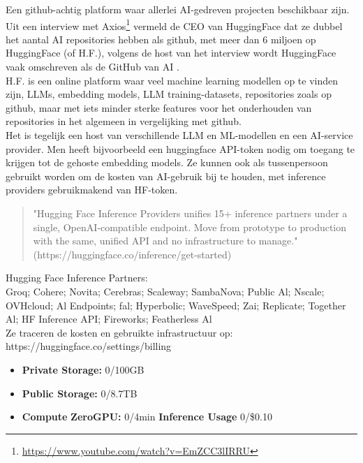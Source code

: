 Een github-achtig platform waar allerlei AI-gedreven projecten beschikbaar zijn. \\

Uit een interview met Axios\footnote{\href{https://www.youtube.com/watch?v=EmZCC3lIRRU}{https://www.youtube.com/watch?v=EmZCC3lIRRU}} vermeld de CEO van HuggingFace dat ze dubbel het aantal AI repositories hebben als github, met meer dan 6 miljoen op HuggingFace (of H.F.), volgens de host van het interview wordt HuggingFace vaak omschreven als de GitHub van AI \autocite{Rubin2025}. \\

H.F. is een online platform waar veel machine learning modellen op te vinden zijn, LLMs, embedding models, LLM training-datasets, repositories zoals op github, maar met iets minder sterke features voor het onderhouden van repositories in het algemeen in vergelijking met github. \\

Het is tegelijk een host van verschillende LLM en ML-modellen en een AI-service provider. Men heeft bijvoorbeeld een huggingface API-token nodig om toegang te krijgen tot de gehoste embedding models. Ze kunnen ook als tussenpersoon gebruikt worden om de kosten van AI-gebruik bij te houden, met inference providers gebruikmakend van HF-token.

\begin{quote}
    "Hugging Face Inference Providers unifies 15+ inference partners under a single, OpenAI‑compatible endpoint.
    Move from prototype to production with the same, unified API and no infrastructure to manage." \\
    (https://huggingface.co/inference/get-started)
\end{quote}

Hugging Face Inference Partners: \\
Groq; Cohere; Novita; Cerebras; Scaleway; SambaNova; Public Al; Nscale; OVHcloud; Al Endpoints; fal; Hyperbolic; WaveSpeed; Zai; Replicate; Together Al; HF Inference API; Fireworks; Featherless Al \\

Ze traceren de kosten en gebruikte infrastructuur op: https://huggingface.co/settings/billing

\begin{itemize}
    \item \textbf{Private Storage:} 0/100GB
    \item \textbf{Public Storage:} 0/8.7TB
    \item \textbf{Compute}
    \subitem \textbf{ZeroGPU:} 0/4min
    \subitem \textbf{Inference Usage} 0/\$0.10
\end{itemize}

